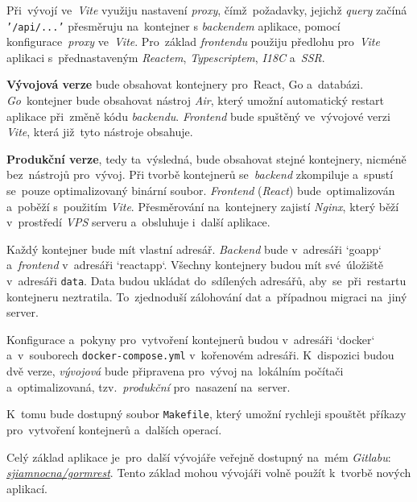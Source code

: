 \documentclass[10pt,a4paper]{article}
\begin{document}
        Při~vývojí ve~\emph{Vite} využiju nastavení \emph{proxy}, čímž~požadavky, jejichž \emph{query} začíná \texttt{'/api/...'} přesměruju na~kontejner s \emph{backendem} aplikace, pomocí konfigurace~\emph{proxy} ve~\emph{Vite}. Pro~základ \emph{frontendu} použiju předlohu pro~\emph{Vite} aplikaci s~přednastaveným \emph{Reactem}, \emph{Typescriptem}, \emph{I18C} a~\emph{SSR}.
        
        \textbf{Vývojová verze} bude obsahovat kontejnery pro~React, Go a~databázi. \emph{Go}~kontejner bude obsahovat nástroj \emph{Air}, který umožní automatický restart aplikace při~změně kódu \emph{backendu}. \emph{Frontend} bude spuštěný ve~vývojové verzi \emph{Vite}, která již~tyto nástroje obsahuje.

        \textbf{Produkční verze}, tedy ta~výsledná, bude obsahovat stejné kontejnery, nicméně bez~nástrojů pro~vývoj. Při tvorbě kontejnerů se~\emph{backend} zkompiluje a~spustí se~pouze optimalizovaný binární soubor. \emph{Frontend} (\emph{React}) bude~optimalizován a~poběží s~použitím \emph{Vite}. Přesměrování na~kontejnery zajistí \emph{Nginx}, který běží v~prostředí \emph{VPS} serveru a~obsluhuje i~další aplikace.

        Každý kontejner bude mít vlastní adresář. \emph{Backend} bude v~adresáři `goapp` a~\emph{frontend} v~adresáři `reactapp`. Všechny kontejnery budou mít své~úložiště v~adresáři \texttt{data}. Data budou ukládat do~sdílených adresářů, aby~se~při~restartu kontejneru neztratila. To~zjednoduší zálohování dat a~případnou migraci na~jiný server.

        Konfigurace a~pokyny pro~vytvoření kontejnerů budou v~adresáři `docker` a~v~souborech \texttt{docker-compose.yml} v~kořenovém adresáři. K~dispozici budou dvě verze, \emph{vývojová} bude připravena pro~vývoj na~lokálním počítači a~optimalizovaná, tzv.~\emph{produkční} pro~nasazení na~server.

        K~tomu bude dostupný soubor \texttt{Makefile}, který umožní rychleji spouštět příkazy pro~vytvoření kontejnerů a~dalších operací.

        Celý základ aplikace je~pro~další vývojáře veřejně dostupný na~mém \emph{Gitlabu}: \href{https://gitlab.com/sjiamnocna/gormrest}{\emph{sjiamnocna/gormrest}}. Tento základ mohou vývojáři volně použít k~tvorbě nových aplikací.
        
\end{document}
